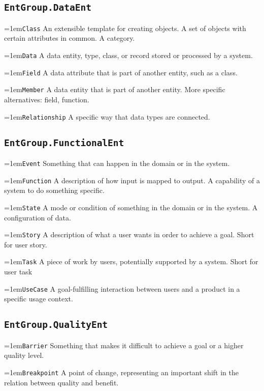 \documentclass[a4paper,oneside]{article}
\begin{document}
\begin{multicols*}{4}
\subsection*{\texttt{EntGroup.DataEnt}}
\hangindent=1em\lstinline+Class+ An extensible template for creating objects. A set of objects with certain attributes in common. A category. 

\hangindent=1em\lstinline+Data+ A data entity, type, class, or record stored or processed by a system. 

\hangindent=1em\lstinline+Field+ A data attribute that is part of another entity, such as a class. 

\hangindent=1em\lstinline+Member+ A data entity that is part of another entity. More specific alternatives: field, function. 

\hangindent=1em\lstinline+Relationship+ A specific way that data types are connected. 


\subsection*{\texttt{EntGroup.FunctionalEnt}}
\hangindent=1em\lstinline+Event+ Something that can happen in the domain or in the system. 

\hangindent=1em\lstinline+Function+ A description of how input is mapped to output. A capability of a system to do something specific. 

\hangindent=1em\lstinline+State+ A mode or condition of something in the domain or in the system. A configuration of data. 

\hangindent=1em\lstinline+Story+ A description of what a user wants in order to achieve a goal. Short for user story. 

\hangindent=1em\lstinline+Task+ A piece of work by users, potentially supported by a system. Short for user task 

\hangindent=1em\lstinline+UseCase+ A goal-fulfilling interaction between users and a product in a specific usage context. 


\subsection*{\texttt{EntGroup.QualityEnt}}
\hangindent=1em\lstinline+Barrier+ Something that makes it difficult to achieve a goal or a higher quality level. 

\hangindent=1em\lstinline+Breakpoint+ A point of change, representing an important shift in the relation between quality and benefit. 


\end{multicols*}
\end{document}
